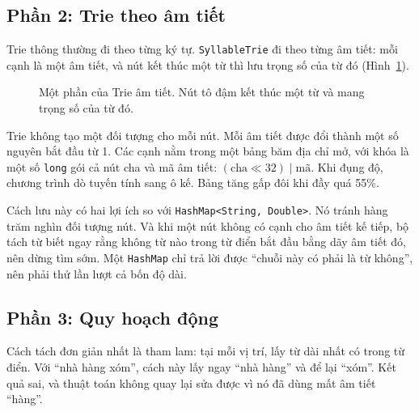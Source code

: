 \documentclass[9pt,twocolumn,a4paper]{extarticle}
\newcommand{\code}[1]{\texttt{#1}}
\begin{document}
\subsection{Phần 2: Trie theo âm tiết}
\label{sec:strie}
Trie thông thường đi theo từng ký tự. \code{SyllableTrie} đi theo từng âm tiết: mỗi cạnh là một âm tiết, và nút kết thúc một từ thì lưu trọng số của từ đó (Hình~\ref{fig:strie}).

\begin{figure}[H]
\centering
{}
\caption{Một phần của Trie âm tiết. Nút tô đậm kết thúc một từ và mang trọng số của từ đó.}
\label{fig:strie}
\end{figure}

Trie không tạo một đối tượng cho mỗi nút. Mỗi âm tiết được đổi thành một số nguyên bắt đầu từ 1. Các cạnh nằm trong một bảng băm địa chỉ mở, với khóa là một số \code{long} gói cả nút cha và mã âm tiết: $(\text{cha}\ll32)\mid\text{mã}$. Khi đụng độ, chương trình dò tuyến tính sang ô kế. Bảng tăng gấp đôi khi đầy quá 55\%.

Cách lưu này có hai lợi ích so với \code{HashMap<String, Double>}. Nó tránh hàng trăm nghìn đối tượng nút. Và khi một nút không có cạnh cho âm tiết kế tiếp, bộ tách từ biết ngay rằng không từ nào trong từ điển bắt đầu bằng dãy âm tiết đó, nên dừng tìm sớm. Một \code{HashMap} chỉ trả lời được ``chuỗi này có phải là từ không'', nên phải thử lần lượt cả bốn độ dài.

\subsection{Phần 3: Quy hoạch động}
\label{sec:dp}
Cách tách đơn giản nhất là tham lam: tại mỗi vị trí, lấy từ dài nhất có trong từ điển. Với ``nhà hàng xóm'', cách này lấy ngay ``nhà hàng'' và để lại ``xóm''. Kết quả sai, và thuật toán không quay lại sửa được vì nó đã dùng mất âm tiết ``hàng''.
\end{document}
